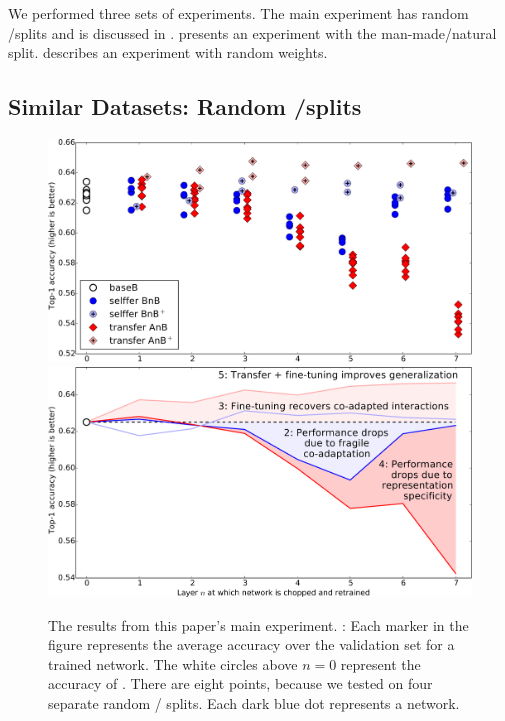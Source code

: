 We performed three sets of experiments. The main experiment has random \dA/\dB splits and is discussed in .  presents an experiment with the man-made/natural split. 
 describes an experiment with random weights.




\subsection{Similar Datasets: Random \dA/\dB splits}


\begin{figure}[t]
\begin{center}
\includegraphics[width=1.0\linewidth]{plots/result_transfer_crop.pdf}
\includegraphics[width=1.0\linewidth]{plots/result_transfer_lines_crop.pdf}
\end{center}
\caption{The results from this paper's main experiment. :
Each marker in the figure represents the average accuracy over the validation set for a trained network. The white circles above $n=0$ represent the accuracy of . There are eight points, because we tested on four separate random / splits. Each dark blue dot represents a  network.
}
\end{figure}
